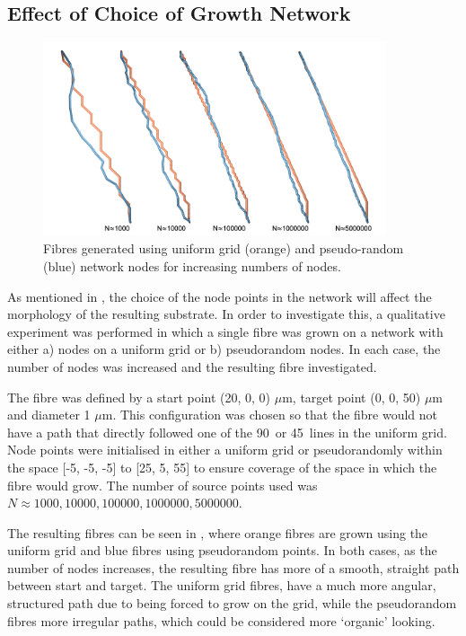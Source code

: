 \subsection{Effect of Choice of Growth Network}
\label{sec:config_choice_of_network}
\begin{figure}
  \centering
  \includegraphics[width=0.9\textwidth]{figures/config/uniform_vs_rand.png}
  \caption{Fibres generated using uniform grid (orange) and pseudo-random (blue) network nodes for increasing numbers of nodes.}
  \label{fig:config_uniform_vs_rand}
\end{figure}
As mentioned in , the choice of the node points in the network will affect the morphology of the resulting substrate.
In order to investigate this, a qualitative experiment was performed in which a single fibre was grown on a network with either a) nodes on a uniform grid or b) pseudorandom nodes.
In each case, the number of nodes was increased and the resulting fibre investigated.

The fibre was defined by a start point (20, 0, 0) $\mu$m,  target point (0, 0, 50) $\mu$m and diameter 1 $\mu$m.
This configuration was chosen so that the fibre would not have a path that directly followed one of the 90\degree\ or 45\degree\ lines in the uniform grid.
Node points were initialised in either a uniform grid or pseudorandomly within the space [-5, -5, -5] to [25, 5, 55] to ensure coverage of the space in which the fibre would grow.
The number of source points used was $N \approx 1000, 10000, 100000, 1000000, 5000000$. 

The resulting fibres can be seen in , where orange fibres are grown using the uniform grid and blue fibres using pseudorandom points.
In both cases, as the number of nodes increases, the resulting fibre has more of a smooth, straight path between start and target.
The uniform grid fibres, have a much more angular, structured path due to being forced to grow on the grid, while the pseudorandom fibres more irregular paths, which could be considered more `organic' looking. 


